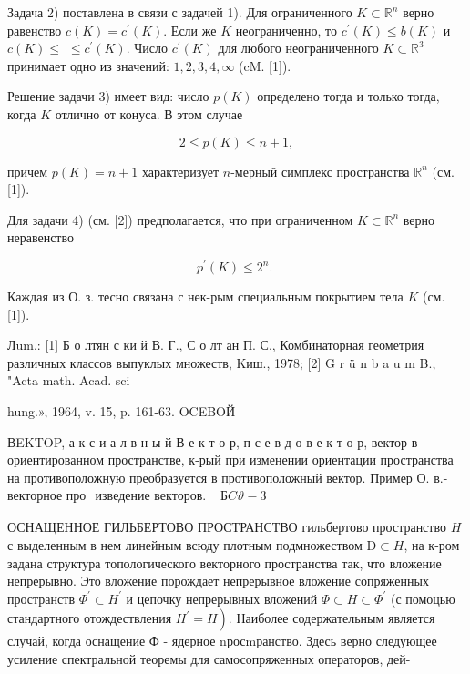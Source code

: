\documentclass[10pt]{article}
\begin{document}
Задача 2) поставлена в связи с задачей 1). Для ограниченного $K \subset \mathbb{R}^{n}$ верно равенство $c(K)=c^{\prime}(K)$. Если же $K$ неограниченно, то $c^{\prime}(K) \leqslant b(K)$ и $c(K) \leqslant$ $\leqslant c^{\prime}(K)$. Число $c^{\prime}(K)$ для любого неограниченного $K \subset \mathbb{R}^{3}$ принимает одно из значений: $1,2,3,4, \infty$ (cM. [1]).



Решение задачи 3) имеет вид: число $p(K)$ определено тогда и только тогда, когда $K$ отлично от конуса. В этом случае



\[

2 \leqslant p(K) \leqslant n+1,

\]



причем $p(K)=n+1$ характеризует $n$-мерный симплекс пространства $\mathbb{R}^{n}$ (см. [1]).



Для задачи 4) (см. [2]) предполагается, что при ограниченном $K \subset \mathbb{R}^{n}$ верно неравенство



\[

p^{\prime}(K) \leqslant 2^{n} \text {. }

\]



Каждая из О. з. тесно связана с нек-рым специальным покрытием тела $K$ (см. [1]).



Лum.: [1] Б о лтян с ки й В. Г., С о лт ан П. С., Комбинаторная геометрия различных классов выпуклых множеств, Kиш., 1978; [2] G r ü n b a u m B., "Acta math. Acad. sci

hung.», 1964, v. 15, p. 161-63. OCEBOЙ

ВEKTOP, а к с и а л в н ы й В е к т о р, п с е в д о в е к т о р, вектор в ориентированном пространстве, к-рый при изменении ориентации пространства на противоположную преобразуется в противоположный вектор. Пример О. в.- векторное про$\begin{array}{ll}\text { изведение векторов. } & \boldsymbol{Б} C \vartheta-3\end{array}$



ОСНАЩЕННОЕ ГИЛЬБЕРТОВО ПРОСТРАНСТВО гильбертово пространство $H$ с выделенным в нем линейным всюду плотным подмножеством $\mathrm{D} \subset H$, на к-ром задана структура топологического векторного пространства так, что вложение непрерывно. Это вложение порождает непрерывное вложение сопряженных пространств $\Phi^{\prime} \subset H^{\prime}$ и цепочку непрерывных вложений $\Phi \subset H \subset \Phi^{\prime}$ (с помоцью стандартного отождествления $\left.H^{\prime}=H\right)$. Наиболее содержательным является случай, когда оснащение Ф - ядерное nросmранство. Здесь верно следующее усиление спектральной теоремы для самосопряженных операторов, дей-
\end{document}

